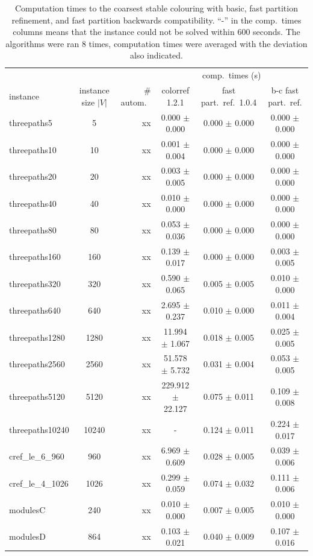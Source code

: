 \documentclass[twoside]{article}
\begin{document}
\begin{table}[h]
\centering
\begin{tabular}{l|c|r|c|c|c}
&&&\multicolumn{3}{c}{comp.\ times (s)}\\
instance& instance size $|V|$ & \# autom.\ & colorref 1.2.1 & fast part.\ ref.\ 1.0.4 & b-c fast part.\ ref.\footnotemark\\
\noalign{\smallskip}\hline\hline\noalign{\smallskip}
threepaths5    & 5       & xx & 0.000 $\pm$ 0.000    & 0.000 $\pm$ 0.000 & 0.000 $\pm$ 0.000 \\
threepaths10   & 10      & xx & 0.001 $\pm$ 0.004    & 0.000 $\pm$ 0.000 & 0.000 $\pm$ 0.000 \\
threepaths20   & 20      & xx & 0.003 $\pm$ 0.005    & 0.000 $\pm$ 0.000 & 0.000 $\pm$ 0.000 \\
threepaths40   & 40      & xx & 0.010 $\pm$ 0.000    & 0.000 $\pm$ 0.000 & 0.000 $\pm$ 0.000 \\
threepaths80   & 80      & xx & 0.053 $\pm$ 0.036    & 0.000 $\pm$ 0.000 & 0.000 $\pm$ 0.000 \\
threepaths160  & 160     & xx & 0.139 $\pm$ 0.017    & 0.000 $\pm$ 0.000 & 0.003 $\pm$ 0.005 \\
threepaths320  & 320     & xx & 0.590 $\pm$ 0.065    & 0.005 $\pm$ 0.005 & 0.010 $\pm$ 0.000 \\
threepaths640  & 640     & xx & 2.695 $\pm$ 0.237    & 0.010 $\pm$ 0.000 & 0.011 $\pm$ 0.004 \\
threepaths1280 & 1280    & xx & 11.994 $\pm$ 1.067   & 0.018 $\pm$ 0.005 & 0.025 $\pm$ 0.005 \\
threepaths2560 & 2560    & xx & 51.578 $\pm$ 5.732   & 0.031 $\pm$ 0.004 & 0.053 $\pm$ 0.005 \\
threepaths5120 & 5120    & xx & 229.912 $\pm$ 22.127 & 0.075 $\pm$ 0.011 & 0.109 $\pm$ 0.008 \\
threepaths10240& 10240   & xx & -                    & 0.124 $\pm$ 0.011 & 0.224 $\pm$ 0.017 \\
cref\_le\_6\_960  & 960  & xx & 6.969 $\pm$ 0.609    & 0.028 $\pm$ 0.005 & 0.039 $\pm$ 0.006 \\
cref\_le\_4\_1026 & 1026 & xx & 0.299 $\pm$ 0.059    & 0.074 $\pm$ 0.032 & 0.111 $\pm$ 0.006 \\
modulesC       & 240      & xx & 0.010 $\pm$ 0.000    & 0.007 $\pm$ 0.005 & 0.010 $\pm$ 0.000 \\
modulesD       & 864      & xx & 0.103 $\pm$ 0.021    & 0.040 $\pm$ 0.009 & 0.107 $\pm$ 0.016 \\
\end{tabular}

\caption{Computation times to the coarsest stable colouring with basic, fast partition refinement, and fast partition backwards compatibility. ``-'' in the comp.\ times columns means that the instance could not be solved within 600 seconds. The algorithms were ran 8 times, computation times were averaged with the deviation also indicated.}
\label{tab:FPR}
\end{table}
\end{document}
